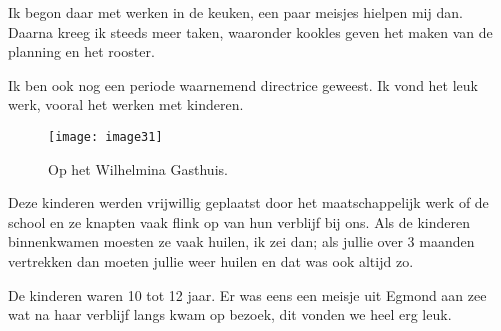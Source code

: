 Ik begon daar met werken in de keuken, een paar meisjes hielpen mij dan. Daarna kreeg ik steeds meer taken, waaronder kookles geven het maken van de planning en het rooster. 

Ik ben ook nog een periode waarnemend directrice geweest. Ik vond het leuk werk, vooral het werken met kinderen. 

\begin{figure}[]
    \texttt{[image: image31]}
    \caption{Op het Wilhelmina Gasthuis.}
\end{figure}

Deze kinderen werden vrijwillig geplaatst door het maatschappelijk werk of de school en ze knapten vaak flink op van hun verblijf bij ons. Als de kinderen binnenkwamen moesten ze vaak huilen, ik zei dan; als jullie over 3 maanden vertrekken dan moeten jullie weer huilen en dat was ook altijd zo. 

De kinderen waren 10 tot 12 jaar. Er was eens een meisje uit Egmond aan zee wat na haar verblijf langs kwam op bezoek, dit vonden we heel erg leuk. 

